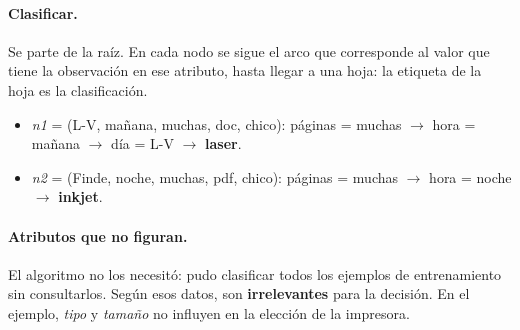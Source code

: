 \documentclass[11pt,a4paper]{article}
\begin{document}
\paragraph{Clasificar.} Se parte de la raíz. En cada nodo se sigue el arco que corresponde al valor que tiene la observación en ese atributo, hasta llegar a una hoja: la etiqueta de la hoja es la clasificación.
\begin{itemize}
  \item \textit{n1} = (L-V, mañana, muchas, doc, chico): páginas = muchas $\to$ hora = mañana $\to$ día = L-V $\to$ \textbf{laser}.
  \item \textit{n2} = (Finde, noche, muchas, pdf, chico): páginas = muchas $\to$ hora = noche $\to$ \textbf{inkjet}.
\end{itemize}

\paragraph{Atributos que no figuran.} El algoritmo no los necesitó: pudo clasificar todos los ejemplos de entrenamiento sin consultarlos. Según esos datos, son \textbf{irrelevantes} para la decisión. En el ejemplo, \textit{tipo} y \textit{tamaño} no influyen en la elección de la impresora.
\end{document}
